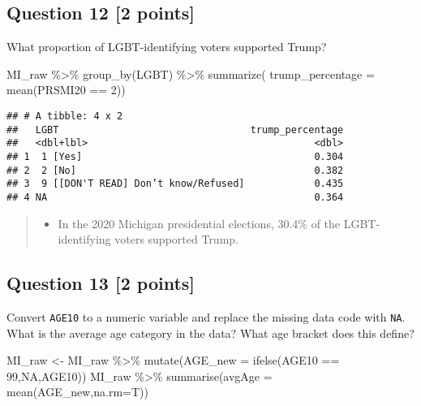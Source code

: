 \documentclass[
]{article}
\newenvironment{Shaded}{\begin{snugshade}}{\end{snugshade}}
\newcommand{\AttributeTok}[1]{\textcolor[rgb]{0.77,0.63,0.00}{#1}}
\newcommand{\ConstantTok}[1]{\textcolor[rgb]{0.00,0.00,0.00}{#1}}
\newcommand{\DecValTok}[1]{\textcolor[rgb]{0.00,0.00,0.81}{#1}}
\newcommand{\FunctionTok}[1]{\textcolor[rgb]{0.00,0.00,0.00}{#1}}
\newcommand{\NormalTok}[1]{#1}
\newcommand{\OtherTok}[1]{\textcolor[rgb]{0.56,0.35,0.01}{#1}}
\newcommand{\SpecialCharTok}[1]{\textcolor[rgb]{0.00,0.00,0.00}{#1}}
\providecommand{\tightlist}{%
  \setlength{\itemsep}{0pt}\setlength{\parskip}{0pt}}
\begin{document}
\hypertarget{question-12-2-points}{%
\subsection{Question 12 {[}2 points{]}}\label{question-12-2-points}}

What proportion of LGBT-identifying voters supported Trump?

\begin{Shaded}
\begin{Highlighting}[]
\NormalTok{MI\_raw }\SpecialCharTok{\%\textgreater{}\%}
  \FunctionTok{group\_by}\NormalTok{(LGBT) }\SpecialCharTok{\%\textgreater{}\%}
  \FunctionTok{summarize}\NormalTok{( }\AttributeTok{trump\_percentage =} \FunctionTok{mean}\NormalTok{(PRSMI20 }\SpecialCharTok{==} \DecValTok{2}\NormalTok{))}
\end{Highlighting}
\end{Shaded}

\begin{verbatim}
## # A tibble: 4 x 2
##   LGBT                                 trump_percentage
##   <dbl+lbl>                                       <dbl>
## 1  1 [Yes]                                        0.304
## 2  2 [No]                                         0.382
## 3  9 [[DON'T READ] Don’t know/Refused]            0.435
## 4 NA                                              0.364
\end{verbatim}

\begin{quote}
\begin{itemize}
\tightlist
\item
  In the 2020 Michigan presidential elections, 30.4\% of the
  LGBT-identifying voters supported Trump.
\end{itemize}
\end{quote}

\hypertarget{question-13-2-points}{%
\subsection{Question 13 {[}2 points{]}}\label{question-13-2-points}}

Convert \texttt{AGE10} to a numeric variable and replace the missing
data code with \texttt{NA}. What is the average age category in the
data? What age bracket does this define?

\begin{Shaded}
\begin{Highlighting}[]
\NormalTok{MI\_raw }\OtherTok{\textless{}{-}}\NormalTok{ MI\_raw }\SpecialCharTok{\%\textgreater{}\%}
  \FunctionTok{mutate}\NormalTok{(}\AttributeTok{AGE\_new =} \FunctionTok{ifelse}\NormalTok{(AGE10 }\SpecialCharTok{==} \DecValTok{99}\NormalTok{,}\ConstantTok{NA}\NormalTok{,AGE10))}
\NormalTok{MI\_raw }\SpecialCharTok{\%\textgreater{}\%}
  \FunctionTok{summarise}\NormalTok{(}\AttributeTok{avgAge =} \FunctionTok{mean}\NormalTok{(AGE\_new,}\AttributeTok{na.rm=}\NormalTok{T))}
\end{Highlighting}
\end{Shaded}
\end{document}
